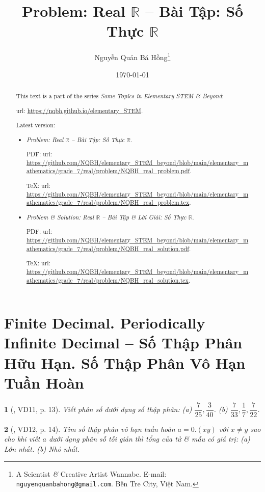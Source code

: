 \documentclass{article}
\title{Problem: Real $\mathbb{R}$ -- Bài Tập: Số Thực $\mathbb{R}$}
\author{Nguyễn Quản Bá Hồng\footnote{A Scientist {\it\&} Creative Artist Wannabe. E-mail: {\tt nguyenquanbahong@gmail.com}. Bến Tre City, Việt Nam.}}
\date{\today}
\newtheorem{baitoan}{}
\begin{document}
\maketitle
\begin{abstract}
	This text is a part of the series {\it Some Topics in Elementary STEM \& Beyond}:
	
	{\sc url}: \url{https://nqbh.github.io/elementary_STEM}.
	
	Latest version:
	\begin{itemize}
		\item {\it Problem: Real $\mathbb{R}$ -- Bài Tập: Số Thực $\mathbb{R}$}.
		
		PDF: {\sc url}: \url{https://github.com/NQBH/elementary_STEM_beyond/blob/main/elementary_mathematics/grade_7/real/problem/NQBH_real_problem.pdf}.
		
		\TeX: {\sc url}: \url{https://github.com/NQBH/elementary_STEM_beyond/blob/main/elementary_mathematics/grade_7/real/problem/NQBH_real_problem.tex}.
		\item {\it Problem \& Solution: Real $\mathbb{R}$ -- Bài Tập \& Lời Giải: Số Thực $\mathbb{R}$}.
		
		PDF: {\sc url}: \url{https://github.com/NQBH/elementary_STEM_beyond/blob/main/elementary_mathematics/grade_7/real/problem/NQBH_real_solution.pdf}.
		
		\TeX: {\sc url}: \url{https://github.com/NQBH/elementary_STEM_beyond/blob/main/elementary_mathematics/grade_7/real/problem/NQBH_real_solution.tex}.
	\end{itemize}
\end{abstract}
\tableofcontents


\section{Finite Decimal. Periodically Infinite Decimal -- Số Thập Phân Hữu Hạn. Số Thập Phân Vô Hạn Tuần Hoàn}

\begin{baitoan}[\cite{Binh_Toan_7_tap_1}, VD11, p. 13]
	Viết phân số dưới dạng số thập phân: (a) $\dfrac{7}{25},\dfrac{3}{40}$. (b) $\dfrac{7}{33},\dfrac{1}{7},\dfrac{7}{22}$.
\end{baitoan}

\begin{baitoan}[\cite{Binh_Toan_7_tap_1}, VD12, p. 14]
	Tìm số thập phân vô hạn tuần hoàn $a = \overline{0.(xy)}$ với $x\ne y$ sao cho khi viết $a$ dưới dạng phân số tối giản thì tổng của tử \& mẫu có giá trị: (a) Lớn nhất. (b) Nhỏ nhất.
\end{baitoan}
\end{document}
